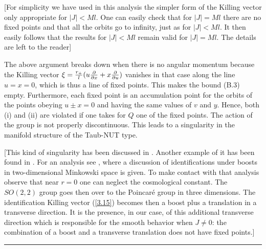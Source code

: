 [For simplicity we have used in this analysis the simpler form
of the Killing vector only appropriate for $|J|<Ml$. One can
easily check that for $|J|=Ml$ there are no fixed points and
that all the orbits go to infinity, just as for $|J|<Ml$. It
then easily follows that the results for $|J|<Ml$ remain valid
for $|J|=Ml$. The details are left to the reader]

The above argument breaks down when there is no angular momentum
because the Killing vector $\xi =\frac{r_+}{l}(u\frac{\partial}{\partial x}
+x\frac{\partial}{\partial u})$ vanishes in that case along the line $u=x=0$, which
is thus a line of fixed points. This makes the bound (B.3)
empty. Furthermore, each fixed point is  an accumulation point for
the orbits of the points obeying $u\pm x =0$ and having the same
values of $v$ and $y$. Hence, both (i) and (ii) are violated if
one takes for $Q$ one of the fixed points. The action of the
group is not properly discontinuous. This leads to a singularity
in the manifold structure of the Taub-NUT type.

[This kind of singularity has been discussed in \cite{14}.
Another example of it has been found in \cite{15}. For an
analysis see \cite{9}, where a discussion of identifications
under boosts in two-dimensional Minkowski space is given. To
make contact with that analysis observe that near $r=0$ one can
neglect the cosmological constant. The $SO(2,2)$ group goes then
over to the Poincar\'e group in three dimensions. The
identification Killing vector (\ref{3.15}) becomes then a boost
plus a translation in a transverse direction. It is the presence,
in our case,  of this additional transverse direction which is
responsible for the smooth behavior when $J\neq 0$: the
combination of a boost and a transverse translation does not
have fixed points.]


\begin{center}
\rule{3cm}{.4mm}
\end{center}

\newpage




